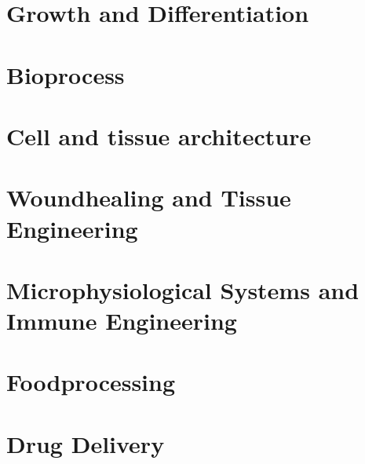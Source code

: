 \documentclass[12pt]{cheatsheet}
\begin{document}
\section*{Growth and Differentiation}

\section*{Bioprocess}

\section*{Cell and tissue architecture}

\section*{Woundhealing and Tissue Engineering}

\section*{Microphysiological Systems and Immune Engineering}

\section*{Foodprocessing}

\section*{Drug Delivery}
\end{document}
